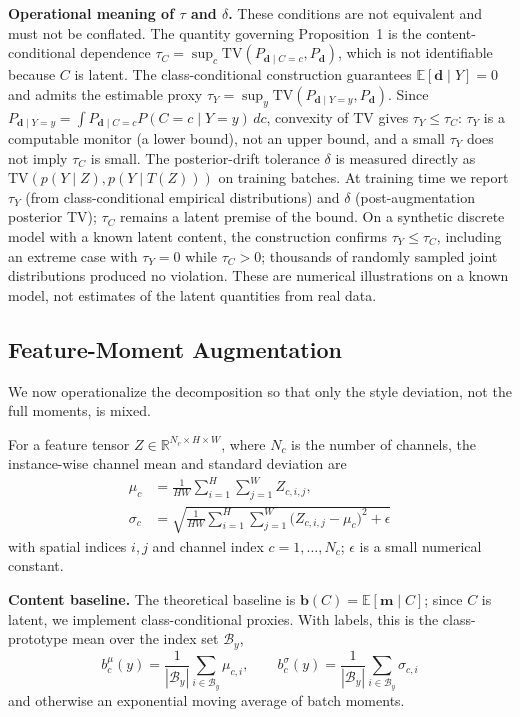 \documentclass[electronics,article,submit,moreauthors]{Definitions/mdpi}
\begin{document}
\noindent\textbf{Operational meaning of $\tau$ and $\delta$.} These conditions are not equivalent and must not be conflated. The quantity governing Proposition~1 is the content-conditional dependence $\tau_C=\sup_c\mathrm{TV}(P_{\mathbf d\mid C=c},P_{\mathbf d})$, which is not identifiable because $C$ is latent. The class-conditional construction guarantees $\mathbb E[\mathbf d\mid Y]=0$ and admits the estimable proxy $\tau_Y=\sup_y\mathrm{TV}(P_{\mathbf d\mid Y=y},P_{\mathbf d})$. Since $P_{\mathbf d\mid Y=y}=\int P_{\mathbf d\mid C=c}P(C=c\mid Y=y)\,dc$, convexity of TV gives $\tau_Y\le\tau_C$: $\tau_Y$ is a computable monitor (a lower bound), not an upper bound, and a small $\tau_Y$ does not imply $\tau_C$ is small. The posterior-drift tolerance $\delta$ is measured directly as $\mathrm{TV}(p(Y\mid Z),p(Y\mid T(Z)))$ on training batches. At training time we report $\tau_Y$ (from class-conditional empirical distributions) and $\delta$ (post-augmentation posterior TV); $\tau_C$ remains a latent premise of the bound. On a synthetic discrete model with a known latent content, the construction confirms $\tau_Y\le\tau_C$, including an extreme case with $\tau_Y=0$ while $\tau_C>0$; thousands of randomly sampled joint distributions produced no violation. These are numerical illustrations on a known model, not estimates of the latent quantities from real data.

\subsection{Feature-Moment Augmentation}
\label{sec:momentaug}

We now operationalize the decomposition so that only the style deviation, not the full moments, is mixed.

For a feature tensor $Z\in\mathbb{R}^{N_c\times H\times W}$, where $N_c$ is the number of channels, the instance-wise channel mean and standard deviation are
\begin{equation}
\begin{aligned}
\mu_c&=\frac{1}{HW}\sum_{i=1}^{H}\sum_{j=1}^{W} Z_{c,i,j},\\
\sigma_c&=\sqrt{\frac{1}{HW}\sum_{i=1}^{H}\sum_{j=1}^{W}\big(Z_{c,i,j}-\mu_c\big)^{2}+\epsilon}
\end{aligned}
\end{equation}
with spatial indices $i,j$ and channel index $c=1,\ldots,N_c$; $\epsilon$ is a small numerical constant.

\noindent\textbf{Content baseline.} The theoretical baseline is $\mathbf{b}(C)=\mathbb{E}[\mathbf{m}\mid C]$; since $C$ is latent, we implement class-conditional proxies. With labels, this is the class-prototype mean over the index set $\mathcal{B}_y$,
\begin{equation}
b_c^\mu(y)=\frac{1}{|\mathcal{B}_y|}\sum_{i\in\mathcal{B}_y}\mu_{c,i},\qquad
b_c^\sigma(y)=\frac{1}{|\mathcal{B}_y|}\sum_{i\in\mathcal{B}_y}\sigma_{c,i}
\end{equation}
and otherwise an exponential moving average of batch moments.
\end{document}
